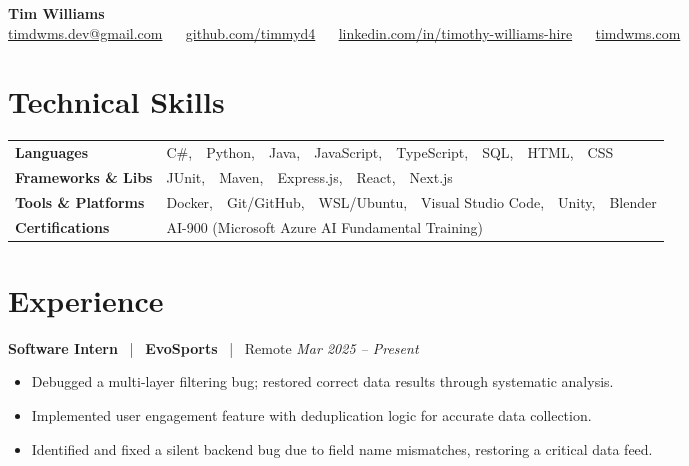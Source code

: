 \documentclass[10pt, letterpaper]{article}
\newcommand{\jobhead}[4]{%
  \vspace{5pt}%
  {\bfseries\color{dark}#1}%
  ~{\color{light}|}~%
  {\bfseries\color{navy}#2}%
  ~{\color{light}|}~%
  {\color{light}#3}%
  \hfill{\color{light}\small\textit{#4}}\\[-2pt]%
}
\newcommand{\skillrow}[2]{%
  {\bfseries #1} & #2 \\[2pt]%
}
\begin{document}

\begin{center}
  {\huge\bfseries\color{navy} Tim Williams}\\[4pt]
  {\small\color{light}
    \href{mailto:timdwms.dev@gmail.com}{timdwms.dev@gmail.com}
    ~\textbullet~
    \href{https://github.com/timmyd4}{github.com/timmyd4}
    ~\textbullet~
    \href{https://www.linkedin.com/in/timothy-williams-hire}{linkedin.com/in/timothy-williams-hire}
    ~\textbullet~
    \href{https://timdwms.com}{timdwms.com}
  }
\end{center}

\vspace{2pt}

\section{Technical Skills}

\begin{tabular}{@{}p{1.6in} p{5.2in}@{}}
  \skillrow{Languages}{C\#,\ \ Python,\ \ Java,\ \ JavaScript,\ \ TypeScript,\ \ SQL,\ \ HTML,\ \ CSS}
  \skillrow{Frameworks \& Libs}{JUnit,\ \ Maven,\ \ Express.js,\ \ React,\ \ Next.js}
  \skillrow{Tools \& Platforms}{Docker,\ \ Git/GitHub,\ \ WSL/Ubuntu,\ \ Visual Studio Code,\ \ Unity,\ \ Blender}
  \skillrow{Certifications}{AI-900 (Microsoft Azure AI Fundamental Training)}
\end{tabular}

\section{Experience}

\jobhead{Software Intern}{EvoSports}{Remote}{Mar 2025 – Present}
\begin{itemize}
  \item Debugged a multi-layer filtering bug; restored correct data results through systematic analysis.
  \item Implemented user engagement feature with deduplication logic for accurate data collection.
  \item Identified and fixed a silent backend bug due to field name mismatches, restoring a critical data feed.
\end{itemize}
\end{document}

